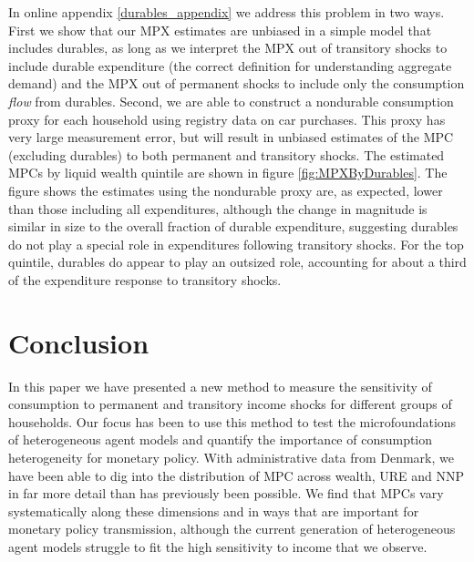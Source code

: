 \documentclass[titlepage]{\econtex}\newcommand{\texname}{ConsumptionHeterogeneity}
\begin{document}
	In online appendix \ref{durables_appendix} we address this problem in two ways. First we show that our MPX estimates are unbiased in a simple model that includes durables, as long as we interpret the MPX out of transitory shocks to include durable expenditure (the correct definition for understanding aggregate demand) and the MPX out of permanent shocks to include only the consumption \textit{flow} from durables. Second, we are able to construct a nondurable consumption proxy for each household using registry data on car purchases. This proxy has very large measurement error, but will result in unbiased estimates of the MPC (excluding durables) to both permanent and transitory shocks. The estimated MPCs by liquid wealth quintile are shown in figure \ref{fig:MPXByDurables}. The figure shows the estimates using the nondurable proxy are, as expected, lower than those including all expenditures, although the change in magnitude is similar in size to the overall fraction of durable expenditure, suggesting durables do not play a special role in expenditures following transitory shocks. For the top quintile, durables do appear to play an outsized role, accounting for about a third of the expenditure response to transitory shocks.
	
	
	\section{Conclusion}
	In this paper we have presented a new method to measure the sensitivity of consumption to permanent and transitory income shocks for different groups of households. Our focus has been to use this method to test the microfoundations of heterogeneous agent models and quantify the importance of consumption heterogeneity for monetary policy. With administrative data from Denmark, we have been able to dig into the distribution of MPC across wealth, URE and NNP in far more detail than has previously been possible. We find that MPCs vary systematically along these dimensions and in ways that are important for monetary policy transmission, although the current generation of heterogeneous agent models struggle to fit the high sensitivity to income that we observe.
	
\end{document}
